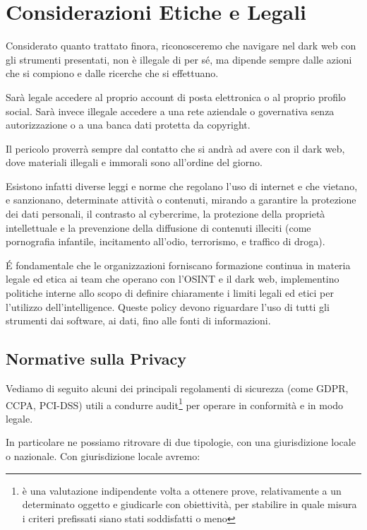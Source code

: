 \chapter{Considerazioni Etiche e Legali}\label{chapter:Considerazioni}

Considerato quanto trattato finora, riconosceremo che navigare nel dark web con gli strumenti presentati, non è illegale di per sé, ma dipende sempre dalle azioni che si compiono e dalle ricerche che si effettuano.

Sarà legale accedere al proprio account di posta elettronica o al proprio profilo social. Sarà invece illegale accedere a una rete aziendale o governativa senza autorizzazione o a una banca dati protetta da copyright.

Il pericolo proverrà sempre dal contatto che si andrà ad avere con il dark web, dove materiali illegali e immorali sono all'ordine del giorno.

Esistono infatti diverse leggi e norme che regolano l’uso di internet e che vietano, e sanzionano, determinate attività o contenuti, mirando a garantire la protezione dei dati personali, il contrasto al cybercrime, la protezione della proprietà intellettuale e la prevenzione della diffusione di contenuti illeciti (come pornografia infantile, incitamento all'odio, terrorismo, e traffico di droga).

\'E fondamentale che le organizzazioni forniscano formazione continua in materia legale ed etica ai team che operano con l'OSINT e il dark web, implementino politiche interne allo scopo di definire chiaramente i limiti legali ed etici per l'utilizzo dell'intelligence. Queste policy devono riguardare l'uso di tutti gli strumenti dai software, ai dati, fino alle fonti di informazioni. 

\newpage
\section{Normative sulla Privacy}\label{sec:cap_sec_cons1}

Vediamo di seguito alcuni dei principali regolamenti di sicurezza (come GDPR, CCPA, PCI-DSS) utili a condurre audit\footnote{è una valutazione indipendente volta a ottenere prove, relativamente a un determinato oggetto e giudicarle con obiettività, per stabilire in quale misura i criteri prefissati siano stati soddisfatti o meno} per operare in conformità e in modo legale.

In particolare ne possiamo ritrovare di due tipologie, con una giurisdizione locale o nazionale.
Con giurisdizione locale avremo:\\

